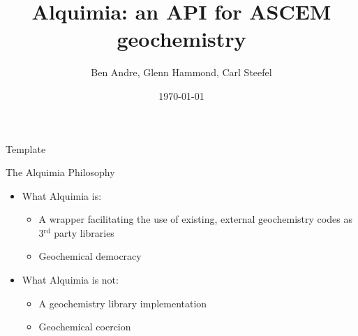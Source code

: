 \documentclass{beamer}
\newcommand\redcolor[1]{{{\color{red} #1}}}
\newcommand\bluecolor[1]{{{\color{blue} #1}}}
\begin{document}
\title[Alquimia]{Alquimia: an API for ASCEM geochemistry}
\author[]{Ben Andre, Glenn Hammond, Carl Steefel}
\date{\today}

\begin{frame}{Template}
\end{frame}

\frame{\titlepage}

\begin{frame}{The Alquimia Philosophy}
\Large
\begin{itemize}
\item What Alquimia \bluecolor{is}:
\begin{itemize}
\Large
\item A wrapper facilitating the use of existing, external
      geochemistry codes as 3$^\text{rd}$ party libraries
\item Geochemical democracy
\end{itemize}

\vspace{1cm}
\item What Alquimia \redcolor{is not}:
\begin{itemize}
\Large
\item A geochemistry library implementation
\item Geochemical coercion
\end{itemize}
\end{itemize}
\end{frame}
\end{document}
